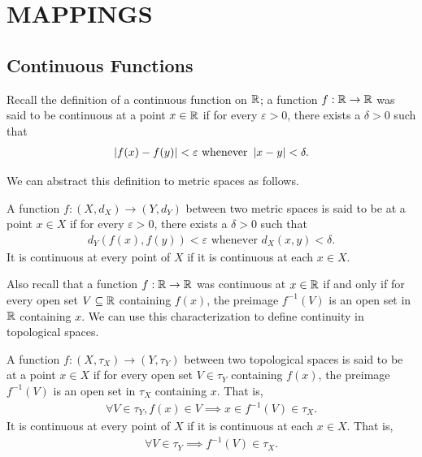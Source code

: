 \chapter{MAPPINGS}

\section{Continuous Functions}
Recall the definition of a continuous function on $\mathbb{R}$; a function $f :\mathbb{R} \to \mathbb{R}$ was said to be continuous at a point $x \in \mathbb{R}$ if for every $\varepsilon > 0$, there exists a $\delta > 0$ such that
\begin{align}
    \left| f(x) - f(y) \right| < \varepsilon \text{ whenever } \left| x - y \right| < \delta.
\end{align}

We can abstract this definition to metric spaces as follows.
\begin{definition}
    A function $f : (X,d_{X}) \to (Y,d_{Y})$ between two metric spaces is said to be  at a point $x \in X$ if for every $\varepsilon > 0$, there exists a $\delta > 0$ such that
    \begin{align}
        d_{Y}(f(x), f(y)) < \varepsilon \text{ whenever } d_{X}(x,y) < \delta.
    \end{align}
    It is continuous at every point of $X$ if it is continuous at each $x \in X$.
\end{definition}

Also recall that a function $f : \mathbb{R} \to \mathbb{R}$ was continuous at $x \in \mathbb{R}$ if and only if for every open set $V \subseteq \mathbb{R}$ containing $f(x)$, the preimage $f^{-1}(V)$ is an open set in $\mathbb{R}$ containing $x$. We can use this characterization to define continuity in topological spaces.

\begin{definition}
    A function $f : (X,\tau_{X}) \to (Y,\tau_{Y})$ between two topological spaces is said to be  at a point $x \in X$ if for every open set $V \in \tau_{Y}$ containing $f(x)$, the preimage $f^{-1}(V)$ is an open set in $\tau_{X}$ containing $x$. That is,
    \begin{align}
        \forall V \in \tau_{Y}, f(x) \in V \implies x \in f^{-1}(V) \in \tau_{X}.
    \end{align}
    It is continuous at every point of $X$ if it is continuous at each $x \in X$. That is,
    \begin{align}
        \forall V \in \tau_{Y} \implies f^{-1}(V) \in \tau_{X}.
    \end{align}
\end{definition}

